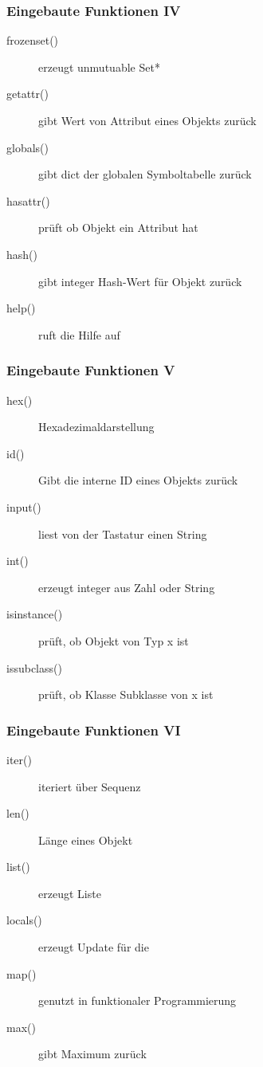 \documentclass[ngerman]{beamer}
\begin{document}
\begin{frame}
\frametitle{Eingebaute Funktionen IV}

\begin{description}
\item[frozenset()] erzeugt unmutuable Set*
\item[getattr()] gibt Wert von Attribut eines Objekts zurück
\item[globals()] gibt dict der globalen Symboltabelle zurück
\item[hasattr()] prüft ob Objekt ein Attribut hat
\item[hash()] gibt integer Hash-Wert für Objekt zurück
\item[help()] ruft die Hilfe auf
\end{description}
\end{frame}


\begin{frame}
\frametitle{Eingebaute Funktionen V}

\begin{description}
\item[hex()] Hexadezimaldarstellung
\item[id()] Gibt die interne ID eines Objekts zurück
\item[input()] liest von der Tastatur einen String
\item[int()] erzeugt integer aus Zahl oder String
\item[isinstance()] prüft, ob Objekt von Typ x ist
\item[issubclass()] prüft, ob Klasse Subklasse von x ist
\end{description}
\end{frame}


\begin{frame}
\frametitle{Eingebaute Funktionen VI}

\begin{description}
\item[iter()] iteriert über Sequenz
\item[len()] Länge eines Objekt
\item[list()] erzeugt Liste
\item[locals()] erzeugt Update für die 
\item[map()] genutzt in funktionaler Programmierung
\item[max()] gibt Maximum zurück
\end{description}
\end{frame}
\end{document}
